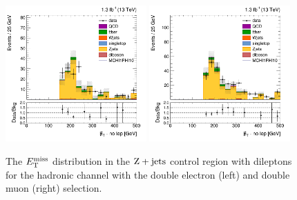 \begin{figure}[htbp]
  \centering
  \includegraphics[width=0.48\textwidth]{figures/hMETNoLepLinear_CRzjets_el.png}
  \includegraphics[width=0.48\textwidth]{figures//hMETNoLepLinear_CRzjets_mu.png}
  \caption{The $E_\mathrm{T}^{\mathrm{miss}}$ distribution in the $\mathrm{Z+jets}$ control region with dileptons for the hadronic channel with the double electron (left) and double muon (right) selection.}
  \label{fig:incl_hadronic_2l0b_fmet}
\end{figure}




